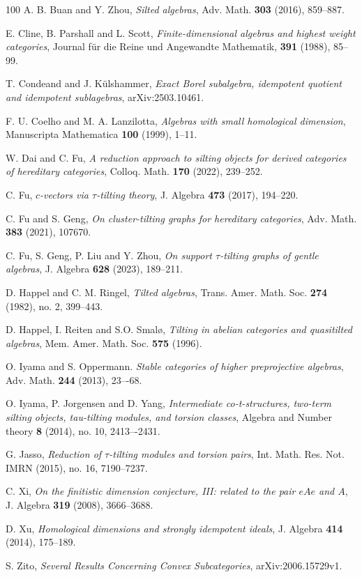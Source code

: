 \documentclass[12pt,a4paper,reqno]{amsart}
\theoremstyle{definition}
\begin{document}
\begin{thebibliography}{100}
A. B. Buan and Y. Zhou, \emph{Silted algebras}, Adv. Math. \textbf{303} (2016), 859--887.

E. Cline, B. Parshall and L. Scott, \emph{Finite-dimensional algebras and highest weight categories},
Journal f\"{u}r die Reine und Angewandte Mathematik, \textbf{391} (1988), 85--99.

T. Condeand and J. K\"{u}lshammer,
\emph{Exact Borel subalgebra, idempotent quotient and idempotent sublagebras}, arXiv:2503.10461.

F. U. Coelho and M. A. Lanzilotta, \emph{Algebras with small homological dimension}, Manuscripta Mathematica \textbf{100} (1999), 1--11.

W. Dai and C. Fu, \emph{A reduction approach to silting objects for derived categories of hereditary categories}, Colloq. Math. \textbf{170} (2022), 239--252.

C. Fu, \emph{$c$-vectors via $\tau$-tilting theory},  J. Algebra \textbf{473} (2017), 194--220.

C. Fu and S. Geng, \emph{On cluster-tilting graphs for hereditary categories}, Adv. Math. \textbf{383} (2021), 107670.

C. Fu, S. Geng, P. Liu and Y. Zhou, \emph{On support $\tau$-tilting graphs of gentle algebras}, J. Algebra \textbf{628} (2023), 189--211.

D. Happel and C. M. Ringel, \emph{Tilted algebras},  Trans. Amer. Math. Soc. \textbf{274} (1982), no. 2, 399--443. 

D. Happel, I. Reiten and  S.O. Smal{\o}, \emph{Tilting in abelian categories and quasitilted algebras}, Mem. Amer. Math. Soc. \textbf{575} (1996).

O. Iyama and S. Oppermann. \emph{Stable categories of higher preprojective algebras}, Adv. Math. \textbf{244} (2013), 23–-68.

O. Iyama, P. Jorgensen and D. Yang, \emph{Intermediate co-t-structures, two-term silting objects, tau-tilting modules, and torsion classes}, Algebra and Number theory \textbf{8} (2014), no. 10, 2413–-2431.


G. Jasso, \emph{Reduction of $\tau$-tilting modules and torsion pairs}, Int. Math. Res. Not. IMRN (2015), no. 16, 7190--7237.

C. Xi, \emph{On the finitistic dimension conjecture, III: related to the pair $eAe$ and $A$},
J. Algebra \textbf{319} (2008), 3666--3688.

D. Xu, \emph{Homological dimensions and strongly idempotent ideals}, J. Algebra \textbf{414} (2014), 175--189.

S. Zito, \emph{Several Results Concerning Convex Subcategories}, arXiv:2006.15729v1.

 \end{thebibliography}
\end{document}

